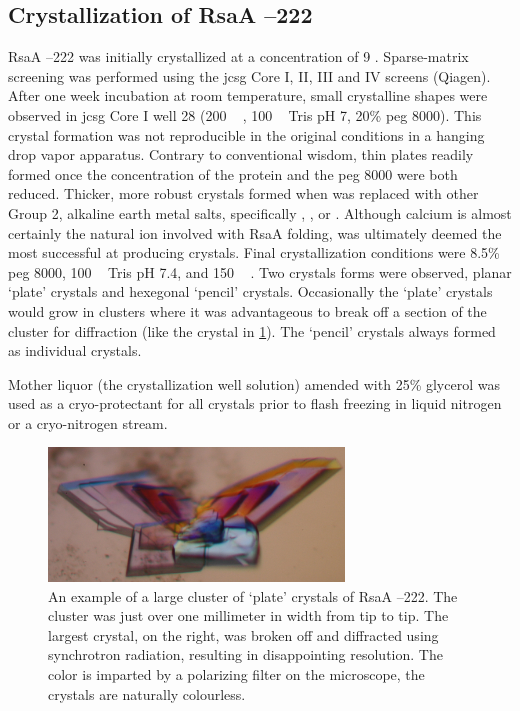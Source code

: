 \subsection{Crystallization of RsaA --222}\label{crystallization}

 RsaA  --222 was initially crystallized at a concentration of 9 \mgperml. Sparse-matrix screening was performed using the \ac{jcsg} Core I, II, III and IV screens (Qiagen). 
After one week incubation at room temperature, small crystalline shapes were
observed in \ac{jcsg} Core I well 28 (200 \si{\milli\molar}  , 100 \si{\milli\molar} Tris pH 7, 20\% \ac{peg}
8000). This crystal formation was  not reproducible in the original conditions in
a hanging drop vapor apparatus. Contrary to conventional wisdom, thin plates readily formed once the concentration
of the protein and the \ac{peg} 8000 were both reduced. Thicker, more robust crystals
formed when  was replaced with other Group 2, alkaline earth metal salts, specifically , , or . Although calcium is almost certainly the natural ion involved with RsaA folding,  was ultimately
deemed the most successful at producing crystals. Final crystallization
conditions were 8.5\% \ac{peg} 8000, 100 \si{\milli\molar} Tris pH 7.4, and 150 \si{\milli\molar} .
Two crystals forms were observed, planar `plate' crystals and hexegonal
`pencil' crystals. Occasionally the `plate' crystals would grow in clusters where it was advantageous to break off a section of the cluster for diffraction (like the crystal in \cref{fig:crystal-flower}). The `pencil' crystals always formed as individual crystals.

 Mother liquor (\ie the crystallization well solution) amended with 25\% glycerol was used as a cryo-protectant for all
crystals prior to flash freezing in liquid nitrogen or a cryo-nitrogen stream.

\begin{figure}[htb]
  	\begin{center}
   		\includegraphics[width=0.7\textwidth]{crystal_chapter/img/bigflowerxtal.jpg}
   	\end{center}
   	\caption[Example of a large cluster of `plate' RsaA --222 crystals]{An example of a large cluster of `plate' crystals of RsaA --222. The cluster was just over one millimeter in width from tip to tip. The largest crystal, on the right, was broken off and diffracted using synchrotron radiation, resulting in disappointing resolution. The color is imparted by a polarizing filter on the microscope, the crystals are naturally colourless.}
   	\label{fig:crystal-flower}
\end{figure}

